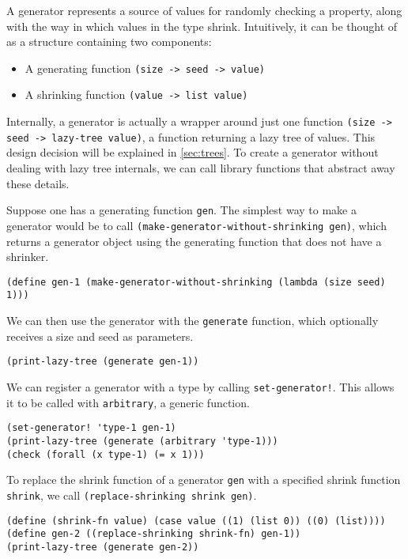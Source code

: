 \documentclass{scrartcl}
\begin{document}
A generator represents a source of values for randomly checking a property,
along with the way in which values in the type shrink.
Intuitively, it can be thought of as a structure containing two components:
\begin{itemize}
\item A generating function \verb|(size -> seed -> value)|
\item A shrinking function \verb|(value -> list value)|
\end{itemize}
Internally, a generator is actually a wrapper around just one function
\verb|(size -> seed -> lazy-tree value)|, a function returning a lazy tree of
values. This design decision will be explained in
\cref{sec:trees}.
To create a generator without dealing with lazy tree internals,
we can call library functions that abstract away these details.

Suppose one has a generating function \verb|gen|. The simplest way to make a
generator would be to call \verb|(make-generator-without-shrinking gen)|,
which returns a generator object using the generating function that does not
have a shrinker.
\begin{verbatim}
(define gen-1 (make-generator-without-shrinking (lambda (size seed) 1)))
\end{verbatim}

We can then use the generator with the \verb|generate| function,
which optionally receives a size and seed as parameters.
\begin{verbatim}
(print-lazy-tree (generate gen-1))
\end{verbatim}

We can register a generator with a type by calling \verb|set-generator!|. This
allows it to be called with \verb|arbitrary|, a generic function.

\begin{verbatim}
(set-generator! 'type-1 gen-1)
(print-lazy-tree (generate (arbitrary 'type-1)))
(check (forall (x type-1) (= x 1)))
\end{verbatim}

To replace the shrink function of a generator \verb|gen| with a specified shrink
function \verb|shrink|, we call \verb|(replace-shrinking shrink gen)|.

\begin{verbatim}
(define (shrink-fn value) (case value ((1) (list 0)) ((0) (list))))
(define gen-2 ((replace-shrinking shrink-fn) gen-1))
(print-lazy-tree (generate gen-2))
\end{verbatim}
\end{document}
